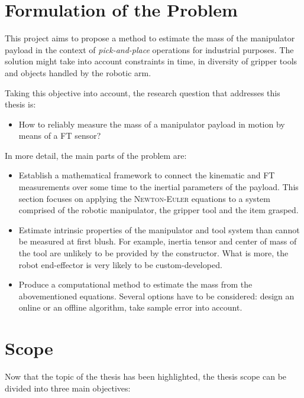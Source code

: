 \documentclass[/home/francois/latex/report/main.tex]{subfiles}
\begin{document}
\section{Formulation of the Problem}

This project aims to propose a method to estimate the mass of the manipulator payload in the context of \textit{pick-and-place} operations for industrial purposes. The solution might take into account constraints in time, in diversity of gripper tools and objects handled by the robotic arm.

Taking this objective into account, the research question that addresses this thesis is:

\begin{itemize}%
  \renewcommand{\labelitemi}{$\Rightarrow$}
 \item How to reliably measure the mass of a manipulator payload in motion by means of a \ac{FT} sensor?
\end{itemize}

In more detail, the main parts of the problem are:

\begin{itemize}
 \item Establish a mathematical framework to connect the kinematic and \ac{FT} measurements over some time to the inertial parameters of the payload. This section focuses on applying the \textsc{Newton-Euler} equations to a system comprised of the robotic manipulator, the gripper tool and the item grasped.
 \item Estimate intrinsic properties of the manipulator and tool system than cannot be measured at first blush. For example, inertia tensor and center of mass of the tool are unlikely to be provided by the constructor. What is more, the robot end-effector is very likely to be custom-developed.
 \item Produce a computational method to estimate the mass from the abovementioned equations. Several options have to be considered: design an online or an offline algorithm, take sample error into account.
\end{itemize}

\section{Scope}

Now that the topic of the thesis has been highlighted, the thesis scope can be divided into three main objectives:
\end{document}
